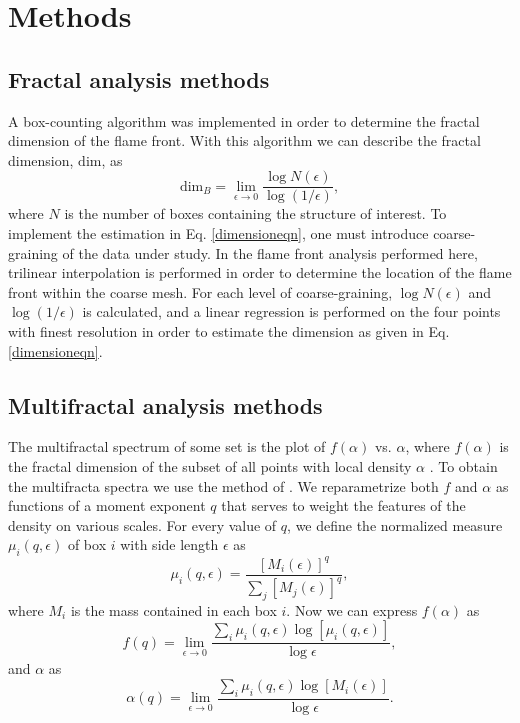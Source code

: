 \documentclass{emulateapj}
\begin{document}
\section{Methods}\label{Methods}

\subsection{Fractal analysis methods}\label{FractalMethods}
A box-counting algorithm \citep[see][for example]{Falconer2003} was implemented in order to determine the fractal dimension of the flame front. With this algorithm we can describe the fractal dimension, $\mathrm{dim}$, as
\begin{equation}\label{dimensioneqn}
	\mathrm{dim}_B = \lim_{\epsilon \to 0} \frac{\log N(\epsilon)}{\log (1 / \epsilon)},
\end{equation}
where $N$ is the number of boxes containing the structure of interest.  To implement the estimation in Eq. \ref{dimensioneqn}, one must introduce coarse-graining of the data under study. In the flame front analysis performed here, trilinear interpolation is performed in order to determine the location of the flame front within the coarse mesh. For each level of coarse-graining, $\log{N(\epsilon)}$ and $\log{(1/\epsilon)}$ is calculated, and a linear regression is performed on the four points with finest resolution in order to estimate the dimension as given in Eq. \ref{dimensioneqn}.

\subsection{Multifractal analysis methods}\label{MultifractalMethods}
The multifractal spectrum of some set is the plot of $f(\alpha)$ vs. $\alpha$, where $f(\alpha)$ is the fractal dimension of the subset of all points with local density $\alpha$ \citep[see][for example]{Falconer2003}. To obtain the multifracta spectra we use the method of \cite{Chhabra1989}. We reparametrize both $f$ and $\alpha$ as functions of a moment exponent $q$ that serves to weight the features of the density on various scales. For every value of $q$, we define the normalized measure $\mu_i(q, \epsilon)$ of box $i$ with side length $\epsilon$ as
\begin{equation} 
	\mu_i(q, \epsilon) = \frac{[M_i(\epsilon)]^q}{\sum_j[M_j(\epsilon)]^q},
\end{equation}
where $M_i$ is the mass contained in each box $i$. Now we can express $f(\alpha)$ as
\begin{equation}
	f(q) = \lim_{\epsilon \to 0} \frac{\sum_i \mu_i(q, \epsilon) \log[\mu_i(q, \epsilon)]}{\log \epsilon},
\end{equation}
and $\alpha$ as
\begin{equation}
	\alpha (q) = \lim_{\epsilon \to 0} \frac{\sum_i \mu_i(q, \epsilon) \log[M_i(\epsilon)]}{\log \epsilon}.
\end{equation}
\end{document}
